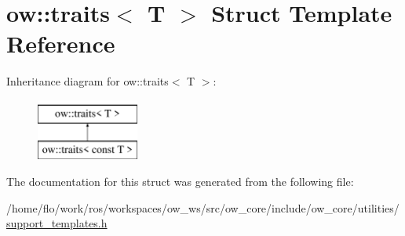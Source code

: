 \hypertarget{structow_1_1traits}{}\section{ow\+:\+:traits$<$ T $>$ Struct Template Reference}
\label{structow_1_1traits}
Inheritance diagram for ow\+:\+:traits$<$ T $>$\+:\begin{figure}[H]
\begin{center}
\leavevmode
\includegraphics[height=2.000000cm]{d3/d3e/structow_1_1traits}
\end{center}
\end{figure}


The documentation for this struct was generated from the following file\+:\begin{DoxyCompactItemize}
\item 
/home/flo/work/ros/workspaces/ow\+\_\+ws/src/ow\+\_\+core/include/ow\+\_\+core/utilities/\hyperlink{support__templates_8h}{support\+\_\+templates.\+h}\end{DoxyCompactItemize}
